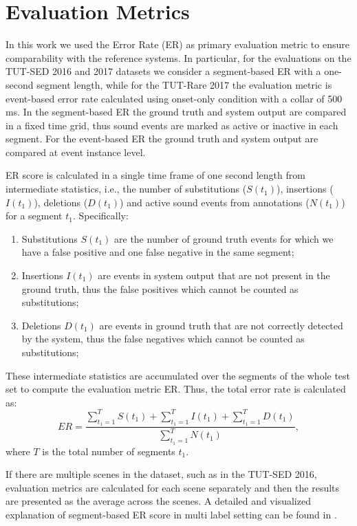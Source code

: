 \section{Evaluation Metrics}

In this work we used the Error Rate (ER) as primary evaluation metric to ensure comparability with the reference systems. In particular, for the evaluations on the TUT-SED 2016 and 2017 datasets we consider a segment-based ER with a one-second segment length, while for the TUT-Rare 2017 the evaluation metric is event-based error rate calculated using onset-only condition with a collar of 500 ms. 
In the segment-based ER the ground truth and system output are compared in a fixed time grid, thus sound events are marked as active or inactive in each segment. For the event-based ER the ground truth and system output are compared at event instance level.

ER score is calculated in a single time frame of one second length from intermediate statistics, i.e., the number of substitutions ($S(t_1)$), insertions ($I(t_1)$), deletions ($D(t_1)$) and active sound events from annotations ($N(t_1)$) for a segment $t_1$. Specifically:
\begin{enumerate}
	
	\item Substitutions $S(t_1)$ are the number of ground truth events for which we have a false positive and one false negative in the same segment; %
	
	\item Insertions $I(t_1)$ are events in system output that are not present in the ground truth, thus the false positives which cannot be counted as substitutions;%
	
	\item Deletions $D(t_1)$ are events in ground truth that are not correctly detected by the system, thus the false negatives which cannot be counted as substitutions;%
	
\end{enumerate}
These intermediate statistics are accumulated over the segments of the whole test set to compute the evaluation metric ER. Thus, the total error rate is calculated as:
\begin{equation}
ER = \frac{\sum_{t_1=1}^{T} S(t_1) + \sum_{t_1=1}^{T} I(t_1) + \sum_{t_1=1}^{T} D(t_1)}{\sum_{t_1=1}^{T} N(t_1)},
\end{equation}
where $T$ is the total number of segments $t_1$.

If there are multiple scenes in the dataset, such as in the TUT-SED 2016, evaluation metrics are calculated for each scene separately and then the results are presented as the average across the scenes.
A detailed and visualized explanation of segment-based ER score in multi label setting can be found in \cite{mesaros2016metrics}.